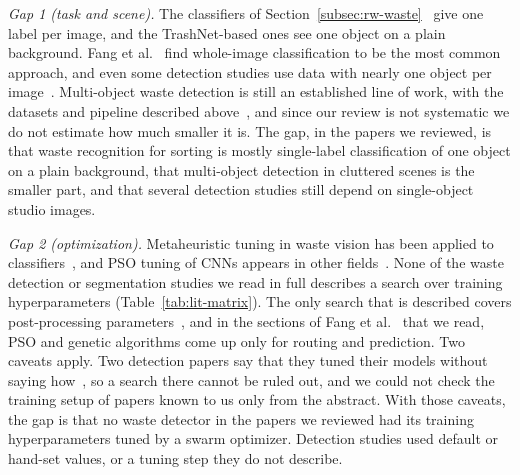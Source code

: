 \textit{Gap 1 (task and scene).} The classifiers of Section~\ref{subsec:rw-waste}~\cite{yang2016classification,kaya2023classification,sayed2024intelligent,alshammari2025smart,kumsetty2022trashbox} give one label per image, and the TrashNet-based ones see one object on a plain background. Fang et al.~\cite{fang2023artificial} find whole-image classification to be the most common approach, and even some detection studies use data with nearly one object per image~\cite{melinte2020deep,kumar2021novel,isalm2025ugvnbwaste}. Multi-object waste detection is still an established line of work, with the datasets and pipeline described above~\cite{proenca2020taco,bashkirova2022zerowaste,cheng2021flow,yudin2024hierarchical,kraft2021autonomous,cordova2022litter,hong2020trashcan,majchrowska2022deep}, and since our review is not systematic we do not estimate how much smaller it is. The gap, in the papers we reviewed, is that waste recognition for sorting is mostly single-label classification of one object on a plain background, that multi-object detection in cluttered scenes is the smaller part, and that several detection studies still depend on single-object studio images.

\textit{Gap 2 (optimization).} Metaheuristic tuning in waste vision has been applied to classifiers~\cite{sayed2024intelligent,mao2021recycling}, and PSO tuning of CNNs appears in other fields~\cite{aguerchi2024cnn}. None of the waste detection or segmentation studies we read in full describes a search over training hyperparameters (Table~\ref{tab:lit-matrix}). The only search that is described covers post-processing parameters~\cite{wang2020multilevel}, and in the sections of Fang et al.~\cite{fang2023artificial} that we read, PSO and genetic algorithms come up only for routing and prediction. Two caveats apply. Two detection papers say that they tuned their models without saying how~\cite{liao2022realtime,bartolo2025learning}, so a search there cannot be ruled out, and we could not check the training setup of papers known to us only from the abstract. With those caveats, the gap is that no waste detector in the papers we reviewed had its training hyperparameters tuned by a swarm optimizer. Detection studies used default or hand-set values, or a tuning step they do not describe.

